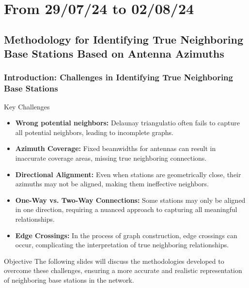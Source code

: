 
\smallframetitle

\section{From 29/07/24 to 02/08/24}
\insertsectionframe


\subsection{Methodology for Identifying True Neighboring Base Stations Based on Antenna Azimuths}
\insertsubsectionframe

\begin{frame}
    \frametitle{Introduction: Challenges in Identifying True Neighboring Base Stations}

    \begin{block}{Key Challenges}
        \begin{itemize}
            \item \textbf{Wrong potential neighbors:} Delaunay triangulatio often fails to capture all potential neighbors, leading to incomplete graphs.
            \item \textbf{Azimuth Coverage:} Fixed beamwidths for antennas can result in inaccurate coverage areas, missing true neighboring connections.
            \item \textbf{Directional Alignment:} Even when stations are geometrically close, their azimuths may not be aligned, making them ineffective neighbors.
            \item \textbf{One-Way vs. Two-Way Connections:} Some stations may only be aligned in one direction, requiring a nuanced approach to capturing all meaningful relationships.
            \item \textbf{Edge Crossings:} In the process of graph construction, edge crossings can occur, complicating the interpretation of true neighboring relationships.
        \end{itemize}
    \end{block}

    \begin{block}{Objective}
        The following slides will discuss the methodologies developed to overcome these challenges, ensuring a more accurate and realistic representation of neighboring base stations in the network.
    \end{block}
\end{frame}


